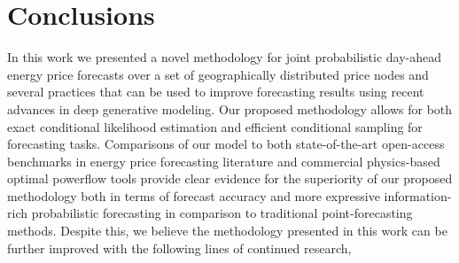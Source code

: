 \chapter{Conclusions}\label{ch:conclusion}

In this work we presented a novel methodology for joint probabilistic day-ahead energy price forecasts over a set of
geographically distributed price nodes and several practices that can be used to improve forecasting results using
recent advances in deep generative modeling.
Our proposed methodology allows for both exact conditional likelihood estimation and efficient conditional sampling for
forecasting tasks.
Comparisons of our model to both state-of-the-art open-access benchmarks in energy price forecasting literature and
commercial physics-based optimal powerflow tools provide clear evidence for the superiority of our proposed methodology
both in terms of forecast accuracy and more expressive information-rich probabilistic forecasting in comparison to
traditional point-forecasting methods.
Despite this, we believe the methodology presented in this work can be further improved with the following
lines of continued research,

